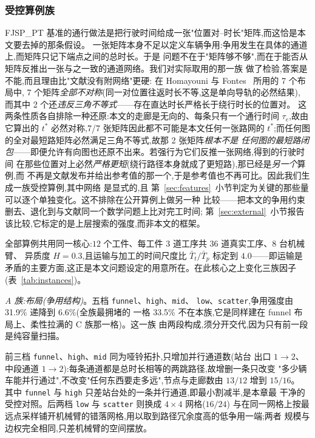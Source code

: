 \documentclass[manuscript,screen,review]{acmart}
\newcommand{\ContentionLo}{6.6\%}
\newcommand{\ContentionHi}{33.5\%}
\newcommand{\ContentionAHi}{31.9\%}
\newcommand{\PubNLayout}{7}
\newcommand{\PubNLayoutAsym}{7}           %
\newcommand{\PubNLayoutBad}{2}            %
\begin{document}
\subsubsection{受控算例族}
FJSP\_PT 基准的通行做法是把行驶时间给成一张"位置对--时长"矩阵,而这恰是本文要去掉的那条假设。
一张矩阵本身不足以定义车辆争用:争用发生在具体的通道上,而矩阵只记下端点之间的总时长。于是
问题不在于"矩阵够不够",而在于能否从矩阵反推出一张与之一致的通道网络。我们对实际取用的那一族
做了检验,答案是不能,而且理由比"文献没有附网络"更硬:
在 Homayouni 与 Fontes~\cite{homayouni2021production} 所用的 \PubNLayout{} 个布局中,
\PubNLayoutAsym{} 个矩阵\emph{全部不对称}(同一对位置往返时长不等,这是单向导轨的必然结果),
而其中 \PubNLayoutBad{} 个还\emph{违反三角不等式}——存在直达时长严格长于绕行时长的位置对。
这两条性质各自排除一种还原:本文的走廊是无向的、每条只有一个通行时间 $\tau_e$,故由它算出的
$t^{*}$ 必然对称,\PubNLayoutAsym{}/\PubNLayout{} 张矩阵因此都不可能是本文任何一张路网的
$t^{*}$;而任何图的全对最短路矩阵必然满足三角不等式,故那 \PubNLayoutBad{} 张矩阵\emph{根本不是
任何图的最短路闭包}——即便允许有向图也还原不出来。若强行为它们反推一张网络,得到的行驶时间
在那些位置对上必然\emph{严格更短}(绕行路径本身就成了更短路),那已经是\emph{另一个}算例,而
不再是文献发布并给出参考值的那一个,于是参考值也不再可比。因此我们生成一族受控算例,其中网络
是显式的,且
第~\ref{sec:features}~小节判定为关键的那些量可以逐个单独变化。这不排除在公开算例上做另一种
比较——把本文的争用约束删去、退化到与文献同一个数学问题上比对完工时间;
第~\ref{sec:external}~小节报告该比较,它标定的是上层搜索的强度,而非本文的框架。

全部算例共用同一核心:$12$ 个工件、每工件 $3$ 道工序共 $36$ 道真实工序、$8$ 台机械臂、
异质度 $H=0.3$,且运输与加工的时间尺度比 $\bar{T}_t/\bar{T}_p$ 标定到 $4.0$——即运输是
矛盾的主要方面,这正是本文问题设定的用意所在。在此核心之上变化三族因子
(表~\ref{tab:instances})。

\emph{A 族:布局(争用结构)}。五档 \texttt{funnel}、\texttt{high}、\texttt{mid}、
\texttt{low}、\texttt{scatter},争用强度由 \ContentionAHi{} 递降到 \ContentionLo{}(全族最拥堵的
一格 \ContentionHi{} 不在本族,它是同样建在 funnel 布局上、柔性拉满的 C 族那一格)。这一族
由两段构成,须分开交代,因为只有前一段是纯容量扫描。

前三档 \texttt{funnel}、\texttt{high}、\texttt{mid} 同为哑铃拓扑,只增加并行通道数(站台
出口 $1\to2$、中段通道 $1\to2$):每条通道都是总时长相等的两跳路径,故增删一条只改变
"多少辆车能并行通过",不改变"任何东西要走多远",节点与走廊数由 $13/12$ 增到 $15/16$。
其中 \texttt{funnel} 与 \texttt{high} 只差站台处的一条并行通道,即最小割减半,是本章最
干净的受控对照。后两档 \texttt{low} 与 \texttt{scatter} 则换成 $4\times4$ 网格($16/24$)
与在同一网格上按最远点采样铺开机械臂的错落网格,用以取到路径冗余度高的低争用一端;两者
规模与边权完全相同,只差机械臂的空间摆放。
\end{document}

